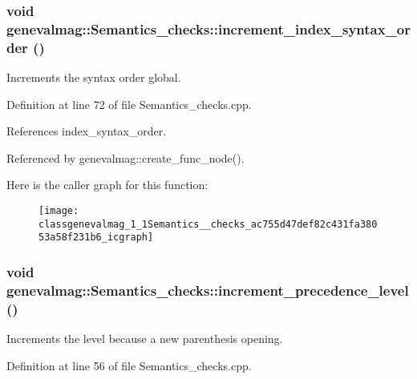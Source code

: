 \hypertarget{classgenevalmag_1_1Semantics__checks_ac755d47def82c431fa38053a58f231b6}{
\subsubsection[{increment\_\-index\_\-syntax\_\-order}]{\setlength{\rightskip}{0pt plus 5cm}void genevalmag::Semantics\_\-checks::increment\_\-index\_\-syntax\_\-order ()}}
\label{classgenevalmag_1_1Semantics__checks_ac755d47def82c431fa38053a58f231b6}
Increments the syntax order global. 

Definition at line 72 of file Semantics\_\-checks.cpp.



References index\_\-syntax\_\-order.



Referenced by genevalmag::create\_\-func\_\-node().



Here is the caller graph for this function:\nopagebreak
\begin{figure}[H]
\begin{center}
\leavevmode
\texttt{[image: classgenevalmag\_1\_1Semantics\_\_checks\_ac755d47def82c431fa38053a58f231b6\_icgraph]}
\end{center}
\end{figure}


\hypertarget{classgenevalmag_1_1Semantics__checks_ae9e488640f503bbd04a212f282f48826}{
\subsubsection[{increment\_\-precedence\_\-level}]{\setlength{\rightskip}{0pt plus 5cm}void genevalmag::Semantics\_\-checks::increment\_\-precedence\_\-level ()}}
\label{classgenevalmag_1_1Semantics__checks_ae9e488640f503bbd04a212f282f48826}
Increments the level because a new parenthesis opening. 

Definition at line 56 of file Semantics\_\-checks.cpp.



